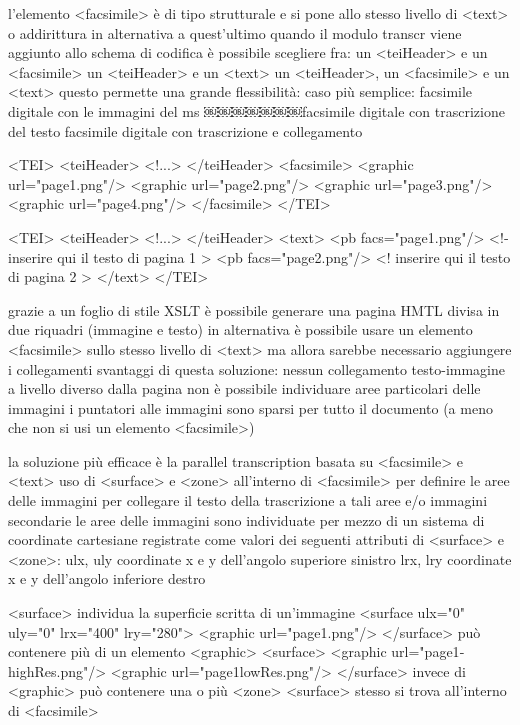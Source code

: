 l’elemento <facsimile> è di tipo strutturale e si pone allo stesso livello di <text> o addirittura in alternativa a quest’ultimo
quando il modulo transcr viene aggiunto allo schema di codifica è possibile scegliere fra:
un <teiHeader> e un <facsimile>
un <teiHeader> e un <text>
un <teiHeader>, un <facsimile> e un <text>
questo permette una grande flessibilità:
caso più semplice: facsimile digitale con le immagini del ms
￼￼￼￼￼￼￼facsimile digitale con trascrizione del testo facsimile digitale con trascrizione e collegamento

<TEI>
 <teiHeader>
  <!­­...­­>
 </teiHeader>
 <facsimile>
  <graphic url="page1.png"/>
  <graphic url="page2.png"/>
  <graphic url="page3.png"/>
  <graphic url="page4.png"/>
 </facsimile>
</TEI>

<TEI>
 <teiHeader>
  <!­­...­­>
 </teiHeader>
 <text>
  <pb facs="page1.png"/>
   <!­­ inserire qui il testo di pagina 1 ­­>
  <pb facs="page2.png"/>
   <!­­ inserire qui il testo di pagina 2 ­­>
 </text>
</TEI>

grazie a un foglio di stile XSLT è possibile generare una pagina HMTL divisa in due riquadri (immagine e testo)
in alternativa è possibile usare un elemento <facsimile> sullo stesso livello di <text>
ma allora sarebbe necessario aggiungere i collegamenti svantaggi di questa soluzione:
nessun collegamento testo-immagine a livello diverso dalla pagina
non è possibile individuare aree particolari delle immagini
i puntatori alle immagini sono sparsi per tutto il documento (a
meno che non si usi un elemento <facsimile>)

la soluzione più efficace è la parallel transcription basata su <facsimile> e <text>
uso di <surface> e <zone> all’interno di <facsimile>
per definire le aree delle immagini
per collegare il testo della trascrizione a tali aree e/o immagini secondarie
le aree delle immagini sono individuate per mezzo di un sistema di coordinate cartesiane registrate come valori dei seguenti attributi di <surface> e <zone>:
ulx, uly coordinate x e y dell’angolo superiore sinistro lrx, lry coordinate x e y dell’angolo inferiore destro

<surface> individua la superficie scritta di un’immagine
<surface ulx="0" uly="0" lrx="400" lry="280"> <graphic url="page1.png"/>
</surface>
può contenere più di un elemento <graphic>
<surface>
<graphic url="page1­highRes.png"/> <graphic url="page1­lowRes.png"/>
</surface>
invece di <graphic> può contenere una o più <zone> <surface> stesso si trova all’interno di <facsimile>

